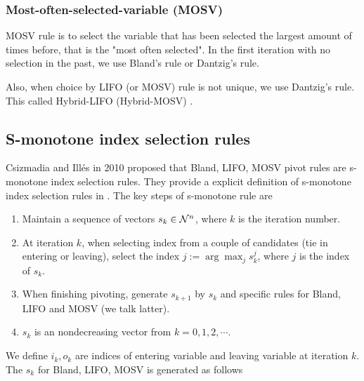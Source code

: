 \documentclass[11pt]{article}
\begin{document}
\subsubsection{Most-often-selected-variable (MOSV)}
MOSV rule is to select the variable that has been selected the largest amount of times before, that is the "most often selected". In the first iteration with no selection in the past, we use Bland's rule or Dantzig's rule.

Also, when choice by LIFO (or MOSV) rule is not unique, we use Dantzig's rule. This called Hybrid-LIFO (Hybrid-MOSV) \cite{zhang1999new}.

\subsection{S-monotone index selection rules}
Csizmadia and Illés in 2010 \cite{csizmadia2012s} proposed that Bland, LIFO, MOSV pivot rules are s-monotone index selection rules. They provide a explicit definition of s-monotone index selection rules in \cite{csizmadia2012s}. The key steps of s-monotone rule are
\begin{enumerate}
\item Maintain a sequence of vectors $s_k \in {\cal N}^n$, where $k$ is the iteration number. 
\item At iteration $k$, when selecting index from a couple of candidates (tie in entering or leaving), select the index $j := \arg \max_j s_k^j$, where $j$ is the index of $s_k$.
\item When finishing pivoting, generate $s_{k+1}$ by $s_{k}$ and specific rules for Bland, LIFO and MOSV (we talk latter). 
\item $s_k$ is an nondecreasing vector from $k=0,1,2,\cdots$.
\end{enumerate}
We define $i_k, o_k$ are indices of entering variable and leaving variable at iteration $k$. The $s_k$ for Bland, LIFO, MOSV is generated as follows
\end{document}
